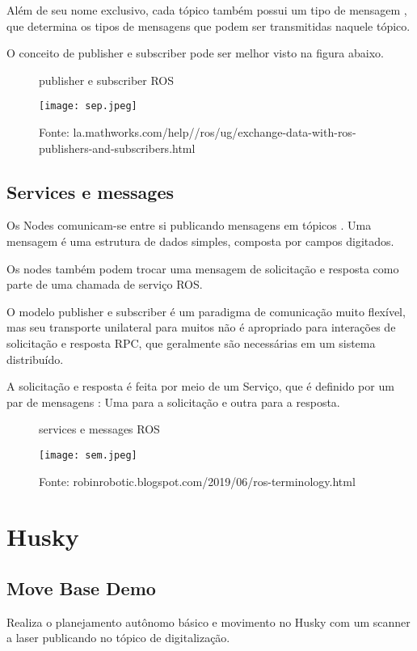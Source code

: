 Além de seu nome exclusivo, cada tópico também possui um tipo de mensagem , que determina os tipos de mensagens que podem ser transmitidas naquele tópico.\cite{WikiROS}

O conceito de publisher e subscriber pode ser melhor visto na figura abaixo.
\begin{figure} [h!]	
   \centering
   \caption{publisher e subscriber ROS}
   \texttt{[image: sep.jpeg]}
   \caption*{Fonte: la.mathworks.com/help//ros/ug/exchange-data-with-ros-publishers-and-subscribers.html}
   \label{fig:publisheresubscriber}
\end{figure}	

\subsection{Services e messages}
Os Nodes comunicam-se entre si publicando mensagens em tópicos . Uma mensagem é uma estrutura de dados simples, composta por campos digitados.\cite{WikiROS}

Os nodes também podem trocar uma mensagem de solicitação e resposta como parte de uma chamada de serviço ROS.

O modelo publisher e subscriber é um paradigma de comunicação muito flexível, mas seu transporte unilateral para muitos não é apropriado
para interações de solicitação e resposta RPC, que geralmente são necessárias em um sistema distribuído.\cite{WikiROS}

A solicitação e resposta é feita por meio de um Serviço, que é definido por um par de mensagens : Uma para a solicitação e outra para a resposta.
\begin{figure} [h!]	
   \centering
   \caption{services e messages ROS}
   \texttt{[image: sem.jpeg]}
   \caption*{Fonte: robinrobotic.blogspot.com/2019/06/ros-terminology.html}
   \label{fig:servicesemessages}
\end{figure}	

 \section{Husky}
 \subsection{Move Base Demo}
 Realiza o planejamento autônomo básico e movimento no Husky com um scanner a laser publicando no tópico de digitalização.\cite{WikiROS}

